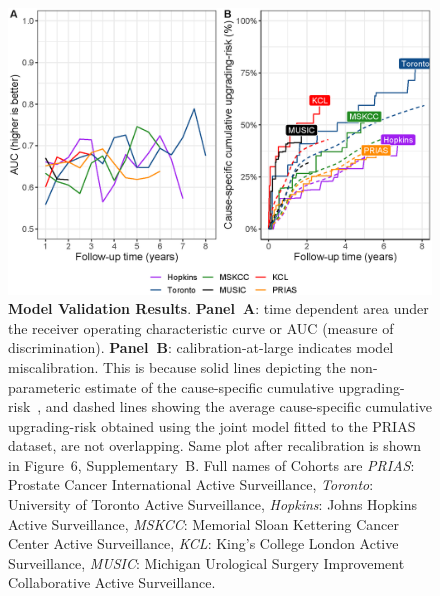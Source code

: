\begin{figure}
\centerline{\includegraphics[width=\columnwidth]{images/auc_beforecalib.eps}}
\caption{\textbf{Model Validation Results}. \textbf{Panel~A}: time dependent area under the receiver operating characteristic curve or AUC (measure of discrimination). \textbf{Panel~B}: calibration-at-large indicates model miscalibration. This is because solid lines depicting the non-parameteric estimate of the cause-specific cumulative upgrading-risk~\citep{turnbull1976empirical}, and dashed lines showing the average cause-specific cumulative upgrading-risk obtained using the joint model fitted to the PRIAS dataset, are not overlapping. Same plot after recalibration is shown in Figure~6, Supplementary~B. Full names of Cohorts are \textit{PRIAS}: Prostate Cancer International Active Surveillance, \textit{Toronto}: University of Toronto Active Surveillance, \textit{Hopkins}: Johns Hopkins Active Surveillance, \textit{MSKCC}: Memorial Sloan Kettering Cancer Center Active Surveillance, \textit{KCL}: King's College London Active Surveillance, \textit{MUSIC}: Michigan Urological Surgery Improvement Collaborative Active Surveillance.}
\label{fig:auc_beforecalib}
\end{figure}

